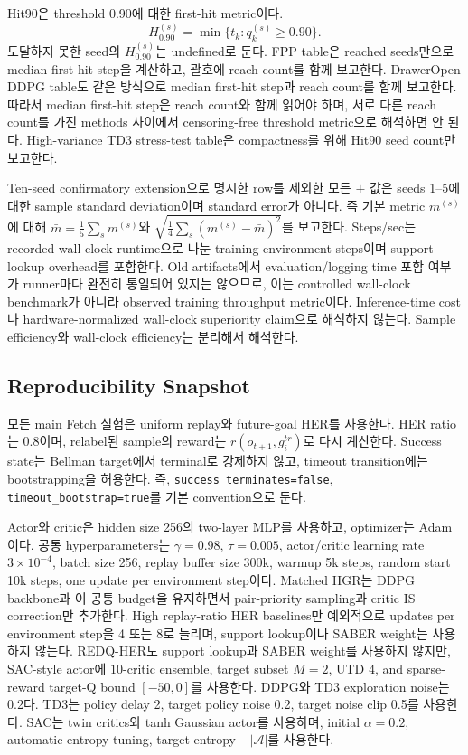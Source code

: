 \documentclass[letterpaper]{article}
\begin{document}
Hit90은 threshold 0.90에 대한 first-hit metric이다.
\begin{equation}
H_{0.90}^{(s)} = \min \{t_k : q_k^{(s)} \ge 0.90\}.
\end{equation}
도달하지 못한 seed의 \(H_{0.90}^{(s)}\)는 undefined로 둔다. FPP table은 reached seeds만으로 median first-hit step을 계산하고, 괄호에 reach count를 함께 보고한다. DrawerOpen DDPG table도 같은 방식으로 median first-hit step과 reach count를 함께 보고한다. 따라서 median first-hit step은 reach count와 함께 읽어야 하며, 서로 다른 reach count를 가진 methods 사이에서 censoring-free threshold metric으로 해석하면 안 된다. High-variance TD3 stress-test table은 compactness를 위해 Hit90 seed count만 보고한다.

Ten-seed confirmatory extension으로 명시한 row를 제외한 모든 \( \pm \) 값은 seeds 1--5에 대한 sample standard deviation이며 standard error가 아니다. 즉 기본 metric \(m^{(s)}\)에 대해 \(\bar m = \frac{1}{5}\sum_s m^{(s)}\)와 \(\sqrt{\frac{1}{4}\sum_s (m^{(s)}-\bar m)^2}\)를 보고한다. Steps/sec는 recorded wall-clock runtime으로 나눈 training environment steps이며 support lookup overhead를 포함한다. Old artifacts에서 evaluation/logging time 포함 여부가 runner마다 완전히 통일되어 있지는 않으므로, 이는 controlled wall-clock benchmark가 아니라 observed training throughput metric이다. Inference-time cost나 hardware-normalized wall-clock superiority claim으로 해석하지 않는다. Sample efficiency와 wall-clock efficiency는 분리해서 해석한다.

\subsection{Reproducibility Snapshot}

모든 main Fetch 실험은 uniform replay와 future-goal HER를 사용한다. HER ratio는 0.8이며, relabel된 sample의 reward는 \(r(o_{t+1},g_i^{tr})\)로 다시 계산한다. Success state는 Bellman target에서 terminal로 강제하지 않고, timeout transition에는 bootstrapping을 허용한다. 즉, \texttt{success\_terminates=false}, \texttt{timeout\_bootstrap=true}를 기본 convention으로 둔다.

Actor와 critic은 hidden size 256의 two-layer MLP를 사용하고, optimizer는 Adam이다. 공통 hyperparameters는 \(\gamma=0.98\), \(\tau=0.005\), actor/critic learning rate \(3\times 10^{-4}\), batch size 256, replay buffer size 300k, warmup 5k steps, random start 10k steps, one update per environment step이다. Matched HGR는 DDPG backbone과 이 공통 budget을 유지하면서 pair-priority sampling과 critic IS correction만 추가한다. High replay-ratio HER baselines만 예외적으로 updates per environment step을 4 또는 8로 늘리며, support lookup이나 SABER weight는 사용하지 않는다. REDQ-HER도 support lookup과 SABER weight를 사용하지 않지만, SAC-style actor에 \(10\)-critic ensemble, target subset \(M=2\), UTD \(4\), and sparse-reward target-Q bound \([-50,0]\)를 사용한다. DDPG와 TD3 exploration noise는 0.2다. TD3는 policy delay 2, target policy noise 0.2, target noise clip 0.5를 사용한다. SAC는 twin critics와 tanh Gaussian actor를 사용하며, initial \(\alpha=0.2\), automatic entropy tuning, target entropy \(-|\mathcal A|\)를 사용한다.
\end{document}
